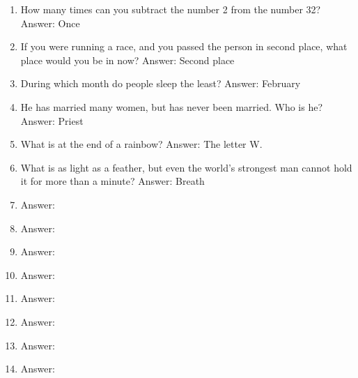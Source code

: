 \documentclass[11pt]{article}
\begin{document}
\begin{enumerate}[label = \arabic*. ]
\item How many times can you subtract the number 2 from the number 32? \hfill Answer: Once

\item If you were running a race, and you passed the person in second place, what place would you be in now? \hfill Answer: Second place 

\item During which month do people sleep the least?  \hfill Answer: February 

\item He has married many women, but has never been married. Who is he? \hfill Answer: Priest 

\item What is at the end of a rainbow? \hfill Answer: The letter W. 

\item What is as light as a feather, but even the world's strongest man cannot hold it for more than a minute?  \hfill Answer: Breath 

\item \hfill Answer: 

\item \hfill Answer: 

\item \hfill Answer: 

\item \hfill Answer: 

\item \hfill Answer: 

\item \hfill Answer: 

\item \hfill Answer: 

\item \hfill Answer: 

\end{enumerate}  
\end{document}
